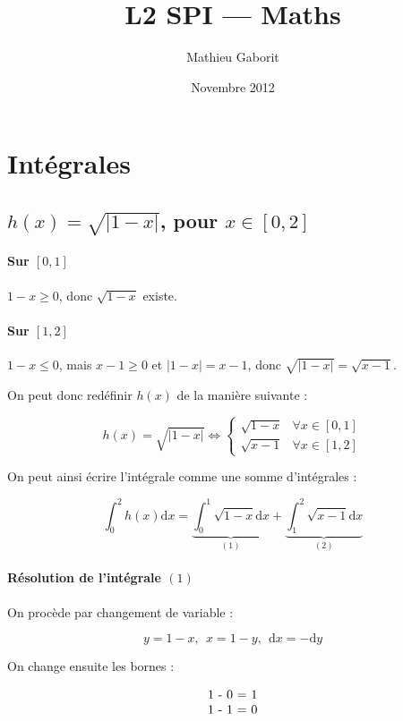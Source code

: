 \documentclass[a4paper, 11pt]{report} %
\title{L2 SPI --- Maths}
\author{Mathieu Gaborit}
\date{Novembre 2012}
\newcommand{\dx}{\mathrm{d}x}
\newcommand{\dy}{\mathrm{d}y}
\begin{document}
    \maketitle

\section{Intégrales} %

\subsection{$h(x) = \sqrt{\left|1-x\right|}$, pour $x\in[0, 2]$} %

\paragraph{Sur $[0,1]$}
$1-x \geq 0$, donc $\sqrt{1-x}$ existe.

\paragraph{Sur $[1,2]$}
$1-x \leq 0$, mais $x-1\geq 0$ et $\left|1-x\right| = x-1$, donc $\sqrt{\left|1-x\right|} = \sqrt{x-1}$.

On peut donc redéfinir $h(x)$ de la manière suivante :

\[
h(x) = \sqrt{\left|1-x\right|} \Leftrightarrow\left\{
    \begin{array}{ll}
        \sqrt{1 - x} &\forall x\in[0,1]\\
        \sqrt{x - 1} &\forall x\in[1,2]
    \end{array}
    \right.
\]

On peut ainsi écrire l'intégrale comme une somme d'intégrales :

\[
\int_0^2h(x)\dx = \underbrace{\int_0^1\sqrt{1-x}\dx}_{(1)} + \underbrace{\int_1^2\sqrt{x-1}\dx}_{(2)}
\]

\paragraph{Résolution de l'intégrale $(1)$}

On procède par changement de variable :

\[ y = 1 - x, ~~ x = 1 - y, ~~ \dx = -\dy \]

On change ensuite les bornes :

\[ \begin{tabular}{c}
    1 - 0 = 1\\
    1 - 1 = 0
\end{tabular}
\]
\end{document}
